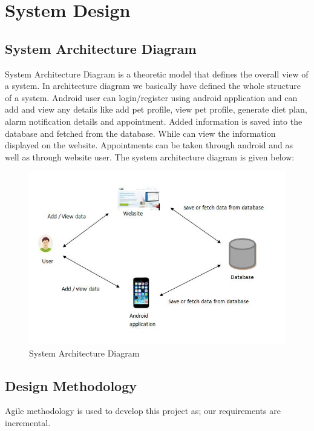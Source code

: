 \chapter{System Design} \label{chap:design}


\section{System Architecture Diagram}
System Architecture Diagram is a theoretic model that defines the overall view of a system. In architecture diagram we basically have defined the whole structure of a system. Android user can login/register using android application and can add and view any details like add pet profile, view pet profile, generate diet plan, alarm notification details and appointment. Added information is saved into the database and fetched from the database. While can view the information displayed on the website. Appointments can be taken through android and as well as through website user. The system architecture diagram is given below:

\begin{figure}[H]
\centering
   \includegraphics[scale=0.7]{4chap}
    \caption{System Architecture Diagram}
\end{figure}

\newpage
\section{Design Methodology}
Agile methodology is used to develop this project as; our requirements are incremental.

